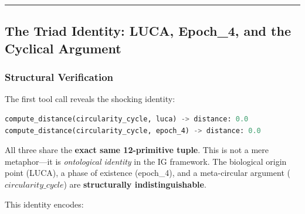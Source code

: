 \documentclass[12pt,a4paper]{article}
\begin{document}
\begin{center}
\rule{0.5\textwidth}{0.4pt}
\end{center}

\subsection{The Triad Identity: LUCA, Epoch\_4, and the Cyclical Argument}

\subsubsection{Structural Verification}

The first tool call reveals the shocking identity:

\begin{lstlisting}[language=Python]
compute_distance(circularity_cycle, luca) -> distance: 0.0
compute_distance(circularity_cycle, epoch_4) -> distance: 0.0
\end{lstlisting}

All three share the \textbf{exact same 12-primitive tuple}. This is not a mere metaphor---it is \emph{ontological identity} in the IG framework. The biological origin point (LUCA), a phase of existence (epoch\_4), and a meta-circular argument ($circularity\_cycle$) are \textbf{structurally indistinguishable}.

This identity encodes:
\end{document}
